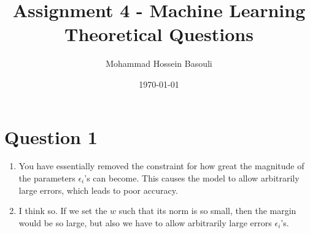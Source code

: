 \documentclass[a4paper,12pt]{article}
\begin{document}
\title{Assignment 4 - Machine Learning \\
Theoretical Questions}
\author{Mohammad Hossein Basouli}
\date{\today}
\maketitle

\section*{Question 1}
\begin{enumerate}[label=(\alph*)]
    \item You have essentially removed the constraint for how great the magnitude of the parameters $\epsilon_i$'s can become. This causes the model to allow arbitrarily large errors, which leads to poor accuracy.
    \item I think so. If we set the $w$ such that its norm is so small, then the margin would be so large, but also we have to allow arbitrarily large errors $\epsilon_i$'s.
\end{enumerate}
\end{document}
